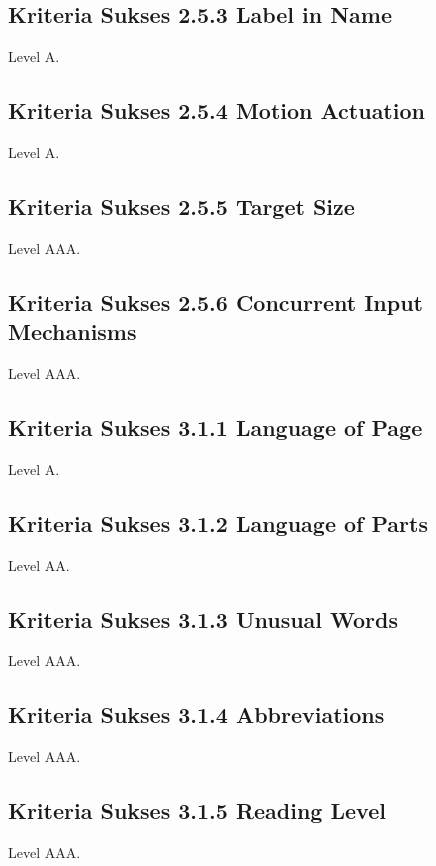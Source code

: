 \subsection{Kriteria Sukses 2.5.3 Label in Name}
\label{sec:kriteria_2.5.3}
Level A.

\subsection{Kriteria Sukses 2.5.4 Motion Actuation}
\label{sec:kriteria_2.5.4}
Level A.

\subsection{Kriteria Sukses 2.5.5 Target Size}
\label{sec:kriteria_2.5.5}
Level AAA.

\subsection{Kriteria Sukses 2.5.6 Concurrent Input Mechanisms}
\label{sec:kriteria_2.5.6}
Level AAA.

\subsection{Kriteria Sukses 3.1.1 Language of Page}
\label{sec:kriteria_3.1.1}
Level A.

\subsection{Kriteria Sukses 3.1.2 Language of Parts}
\label{sec:kriteria_3.1.2}
Level AA.

\subsection{Kriteria Sukses 3.1.3 Unusual Words}
\label{sec:kriteria_3.1.3}
Level AAA.

\subsection{Kriteria Sukses 3.1.4 Abbreviations}
\label{sec:kriteria_3.1.4}
Level AAA.

\subsection{Kriteria Sukses 3.1.5 Reading Level}
\label{sec:kriteria_3.1.5}
Level AAA.

